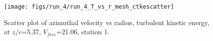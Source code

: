 \begin{figure}[H]
\centering
\texttt{[image: figs/run\_4/run\_4\_T\_vs\_r\_mesh\_ctkescatter]}
\caption{Scatter plot of azimuthal velocity vs radius, turbulent kinetic energy, at $z/c$=5.37, $V_{free}$=21.06, station 1.}
\label{fig:run_4_T_vs_r_mesh_ctkescatter}
\end{figure}


